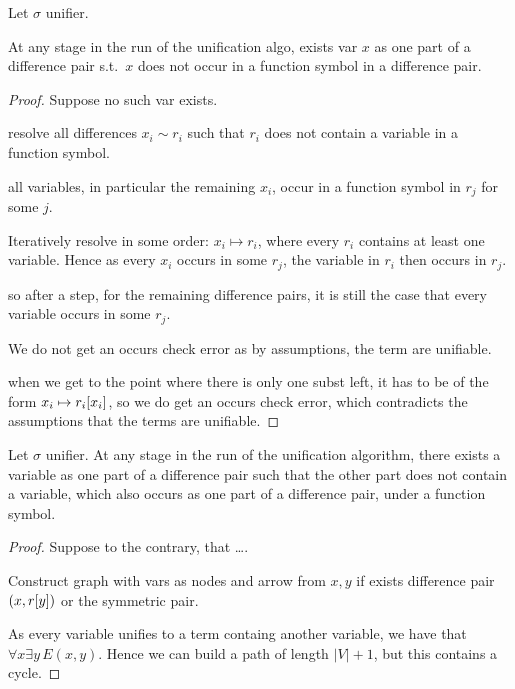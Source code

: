 \documentclass[,%
	paper=a4,%
	DIV11, %
	twoside=false,%
	liststotoc,
	bibtotoc,
	draft=false,%
	numbers=noendperiod
]{scrartcl}
\begin{document}
\begin{lemma}
	Let $\sigma$ unifier.

	At any stage in the run of the unification algo, exists var $x$ as one part of a difference pair s.t.\ $x$ does not occur in a function symbol in a difference pair.
\end{lemma}
\begin{proof}
	Suppose no such var exists. 


	{\tiny

		resolve all differences $x_i \sim r_i$ such that $r_i$ does not contain a variable in a function symbol.

		all variables, in particular the remaining $x_i$, occur in a function symbol in $r_j$ for some $j$.

		Iteratively resolve in some order: $x_i \mapsto r_i$, where every $r_i$ contains at least one variable.
		Hence as every $x_i$ occurs in some $r_j$, the variable in $r_i$ then occurs in $r_j$.

		so after a step, for the remaining difference pairs, it is still the case that every variable occurs in some $r_j$.

		We do not get an occurs check error as by assumptions, the term are unifiable.

		when we get to the point where there is only one subst left, it has to be of the form $x_i \mapsto r_i[x_i]$, so we do get an occurs check error, which contradicts the assumptions that the terms are unifiable.

	}
\end{proof}

\begin{lemma}
	Let $\sigma$ unifier. 
	At any stage in the run of the unification algorithm, there exists a variable as one part of a difference pair such that the other part does not contain a variable, which also occurs as one part of a difference pair, under a function symbol.
\end{lemma}
\begin{proof}
	Suppose to the contrary, that \dots.

	Construct graph with vars as nodes and arrow from $x, y$ if exists difference pair $(x, r[y])$ or the symmetric pair.

	As every variable unifies to a term containg another variable, we have that $\forall x \exists y\,E(x, y)$. Hence we can build a path of length $|V|+1$, but this contains a cycle. 

\end{proof}
\end{document}
